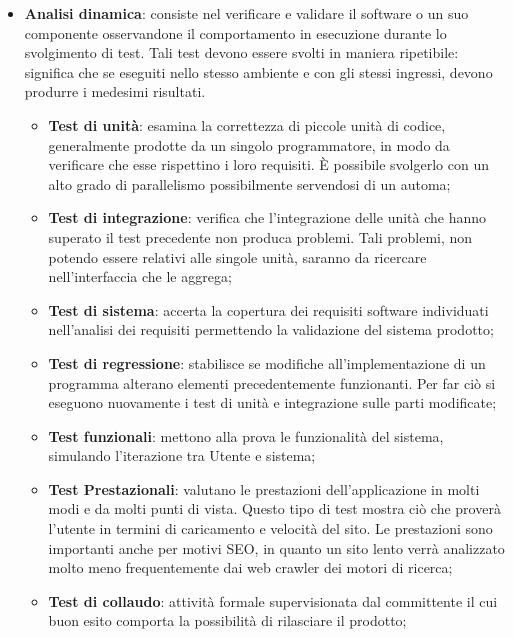 {{\begin{itemize}
		\item \textbf{Analisi dinamica}: consiste nel verificare e validare il software o un suo componente osservandone il comportamento in esecuzione durante lo svolgimento di test. Tali test devono essere svolti in maniera ripetibile: significa che se eseguiti nello stesso ambiente e con gli stessi ingressi, devono produrre i medesimi risultati.
		\begin{itemize}
			\item \textbf{Test di unità}: esamina la correttezza di piccole unità di codice, generalmente prodotte da un singolo programmatore, in modo da verificare che esse rispettino i loro requisiti. È possibile svolgerlo con un alto grado di parallelismo possibilmente servendosi di un automa;		
			\item \textbf{Test di integrazione}: verifica che l'integrazione delle unità che hanno superato il test precedente non produca problemi. Tali problemi, non potendo essere relativi alle singole unità, saranno da ricercare nell'interfaccia che le aggrega;	
			\item \textbf{Test di sistema}: accerta la copertura dei requisiti\ped{g} software individuati nell'analisi dei requisiti permettendo la validazione del sistema prodotto;
			\item \textbf{Test di regressione}: stabilisce se modifiche all'implementazione di un programma alterano elementi precedentemente funzionanti. Per far ciò si eseguono nuovamente i test di unità e integrazione sulle parti modificate;			
			\item \textbf{Test funzionali}: mettono alla prova le funzionalità del sistema, simulando l'iterazione tra Utente e sistema;		
			\item \textbf{Test Prestazionali}: valutano le prestazioni dell'applicazione in molti modi e da molti punti di vista. Questo tipo di test mostra ciò che proverà l'utente in termini di caricamento e velocità del sito. Le prestazioni sono importanti anche per motivi SEO, in quanto un sito lento verrà analizzato molto meno frequentemente dai web\ped{g} crawler dei motori di ricerca;			
			\item \textbf{Test di collaudo}: attività formale supervisionata dal committente il cui buon esito comporta la possibilità di rilasciare il prodotto;
		\end{itemize}
	\end{itemize}
	}
}

